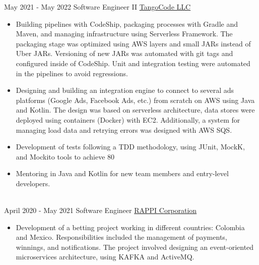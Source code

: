 \documentclass[letterpaper]{twentysecondcv} %
\begin{document}
\begin{twentyla} %

\twentyitem
    {May 2021 -}
    {May 2022}
    {Software Engineer II}
    {\href{https://tangocode.com/}{TangoCode LLC}}
    {}
    {
        \begin{itemize}
            \item Building pipelines with CodeShip, packaging processes with Gradle and Maven, and managing infrastructure using Serverless Framework. The packaging stage was optimized using AWS layers and small JARs instead of Uber JARs. Versioning of new JARs was automated with git tags and configured inside of CodeShip. Unit and integration testing were automated in the pipelines to avoid regressions.
        \end{itemize}

        \begin{itemize}
            \item Designing and building an integration engine to connect to several ads platforms (Google Ads, Facebook Ads, etc.) from scratch on AWS using Java and Kotlin. The design was based on serverless architecture, data stores were deployed using containers (Docker) with EC2. Additionally, a system for managing load data and retrying errors was designed with AWS SQS.
         \end{itemize}

        \begin{itemize}
            \item Development of tests following a TDD methodology, using JUnit, MockK, and Mockito tools to achieve 80%
        \end{itemize}

        \begin{itemize}
            \item Mentoring in Java and Kotlin for new team members and entry-level developers.
        \end{itemize}
    }
    \\




\twentyitem
    {April 2020 -}
    {May 2021}
    {Software Engineer}
    {\href{https://www.rappi.com.ec/}{RAPPI Corporation}}
    {}
    {
        \begin{itemize}
            \item Development of a betting project working in different countries: Colombia and Mexico. Responsibilities included the management of payments, winnings, and notifications. The project involved designing an event-oriented microservices architecture, using KAFKA and ActiveMQ.
         \end{itemize}

}
\end{twentyla}
\end{document}
